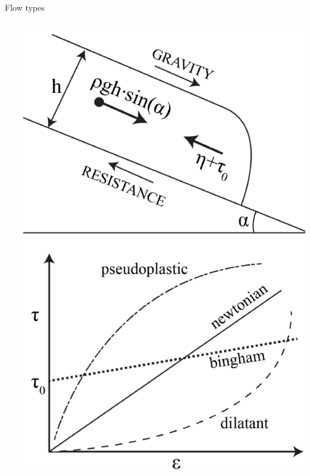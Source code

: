 \documentclass[10pt,aspectratio=169]{beamer}
\begin{document}
\begin{frame}{Flow types}
\begin{columns}[T]
\begin{column}{0.65\textwidth}

      \end{column}

      \begin{column}{0.35\textwidth}	
        \includegraphics[width=1\textwidth]{img/rheology.png}
      \end{column}
    \end{columns}

    
\end{frame}
\end{document}
